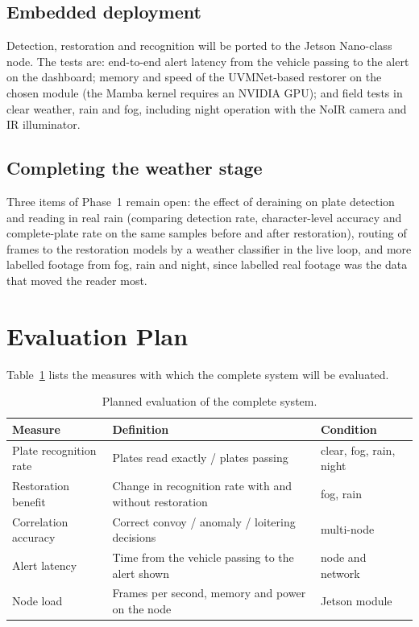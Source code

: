 \subsection{Embedded deployment}

Detection, restoration and recognition will be ported to the Jetson Nano-class
node. The tests are: end-to-end alert latency from the vehicle passing to the
alert on the dashboard; memory and speed of the UVMNet-based restorer on the
chosen module (the Mamba kernel requires an NVIDIA GPU); and field tests in
clear weather, rain and fog, including night operation with the NoIR camera and
IR illuminator.

\subsection{Completing the weather stage}

Three items of Phase~1 remain open: the effect of deraining on plate detection
and reading in real rain (comparing detection rate, character-level accuracy and
complete-plate rate on the same samples before and after restoration), routing
of frames to the restoration models by a weather classifier in the live loop,
and more labelled footage from fog, rain and night, since labelled real
footage was the data that moved the reader most.

\section{Evaluation Plan}

Table~\ref{tab:eval} lists the measures with which the complete system will be
evaluated.

\begin{table}[t]
\centering
\caption{Planned evaluation of the complete system.}
\label{tab:eval}
\small
\begin{tabularx}{\textwidth}{@{}lXl@{}}
\toprule
\textbf{Measure} & \textbf{Definition} & \textbf{Condition}\\
\midrule
Plate recognition rate & Plates read exactly / plates passing & clear, fog, rain, night\\
Restoration benefit & Change in recognition rate with and without restoration & fog, rain\\
Correlation accuracy & Correct convoy / anomaly / loitering decisions & multi-node\\
Alert latency & Time from the vehicle passing to the alert shown & node and network\\
Node load & Frames per second, memory and power on the node & Jetson module\\
\bottomrule
\end{tabularx}
\end{table}

